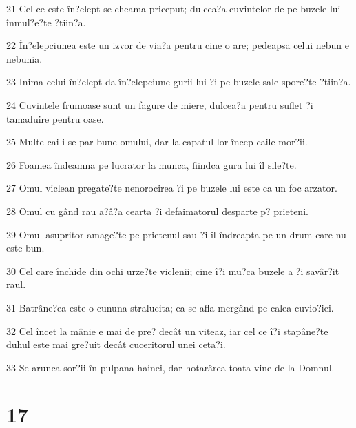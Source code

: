 \par 21 Cel ce este în?elept se cheama priceput; dulcea?a cuvintelor de pe buzele lui înmul?e?te ?tiin?a.
\par 22 În?elepciunea este un izvor de via?a pentru cine o are; pedeapsa celui nebun e nebunia.
\par 23 Inima celui în?elept da în?elepciune gurii lui ?i pe buzele sale spore?te ?tiin?a.
\par 24 Cuvintele frumoase sunt un fagure de miere, dulcea?a pentru suflet ?i tamaduire pentru oase.
\par 25 Multe cai i se par bune omului, dar la capatul lor încep caile mor?ii.
\par 26 Foamea îndeamna pe lucrator la munca, fiindca gura lui îl sile?te.
\par 27 Omul viclean pregate?te nenorocirea ?i pe buzele lui este ca un foc arzator.
\par 28 Omul cu gând rau a?â?a cearta ?i defaimatorul desparte p? prieteni.
\par 29 Omul asupritor amage?te pe prietenul sau ?i îl îndreapta pe un drum care nu este bun.
\par 30 Cel care închide din ochi urze?te viclenii; cine î?i mu?ca buzele a ?i savâr?it raul.
\par 31 Batrâne?ea este o cununa stralucita; ea se afla mergând pe calea cuvio?iei.
\par 32 Cel încet la mânie e mai de pre? decât un viteaz, iar cel ce î?i stapâne?te duhul este mai gre?uit decât cuceritorul unei ceta?i.
\par 33 Se arunca sor?ii în pulpana hainei, dar hotarârea toata vine de la Domnul.

\chapter{17}

